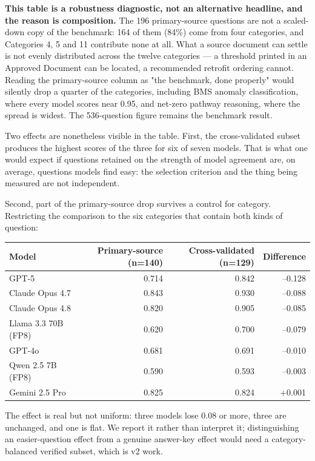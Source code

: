 \documentclass[11pt,a4paper]{article}
\begin{document}
\textbf{This table is a robustness diagnostic, not an alternative headline, and the reason is composition.} The 196 primary-source questions are not a scaled-down copy of the benchmark: 164 of them (84\%) come from four categories, and Categories 4, 5 and 11 contribute none at all. What a source document can settle is not evenly distributed across the twelve categories --- a threshold printed in an Approved Document can be located, a recommended retrofit ordering cannot. Reading the primary-source column as "the benchmark, done properly" would silently drop a quarter of the categories, including BMS anomaly classification, where every model scores near 0.95, and net-zero pathway reasoning, where the spread is widest. The 536-question figure remains the benchmark result.

Two effects are nonetheless visible in the table. First, the cross-validated subset produces the highest scores of the three for six of seven models. That is what one would expect if questions retained on the strength of model agreement are, on average, questions models find easy: the selection criterion and the thing being measured are not independent.

Second, part of the primary-source drop survives a control for category. Restricting the comparison to the six categories that contain both kinds of question:

\begin{center}
\begin{tabular}{lrrr}
\toprule
Model & Primary-source (n=140) & Cross-validated (n=129) & Difference \\
\midrule
GPT-5 & 0.714 & 0.842 & --0.128 \\
Claude Opus 4.7 & 0.843 & 0.930 & --0.088 \\
Claude Opus 4.8 & 0.820 & 0.905 & --0.085 \\
Llama 3.3 70B (FP8) & 0.620 & 0.700 & --0.079 \\
GPT-4o & 0.681 & 0.691 & --0.010 \\
Qwen 2.5 7B (FP8) & 0.590 & 0.593 & --0.003 \\
Gemini 2.5 Pro & 0.825 & 0.824 & +0.001 \\
\bottomrule
\end{tabular}
\end{center}

The effect is real but not uniform: three models lose 0.08 or more, three are unchanged, and one is flat. We report it rather than interpret it; distinguishing an easier-question effect from a genuine answer-key effect would need a category-balanced verified subset, which is v2 work.
\end{document}
